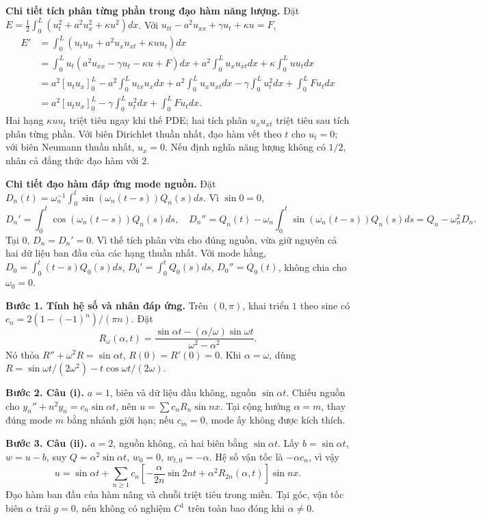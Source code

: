 \textbf{Chi tiết tích phân từng phần trong đạo hàm năng lượng.} Đặt $E=\frac12\int_0^L(u_t^2+a^2u_x^2+\kappa u^2)dx$. Với $u_{tt}-a^2u_{xx}+\gamma u_t+\kappa u=F$,
\[\begin{aligned}
E'&=\int_0^L(u_tu_{tt}+a^2u_xu_{xt}+\kappa uu_t)dx\\
&=\int_0^Lu_t(a^2u_{xx}-\gamma u_t-\kappa u+F)dx
+a^2\int_0^Lu_xu_{xt}dx+\kappa\int_0^Luu_tdx\\
&=a^2[u_tu_x]_0^L-a^2\int_0^Lu_{tx}u_xdx
+a^2\int_0^Lu_xu_{xt}dx-\gamma\int_0^Lu_t^2dx+\int_0^LFu_tdx\\
&=a^2[u_tu_x]_0^L-\gamma\int_0^Lu_t^2dx+\int_0^LFu_tdx.
\end{aligned}\]
Hai hạng $\kappa uu_t$ triệt tiêu ngay khi thế PDE; hai tích phân $u_xu_{xt}$ triệt tiêu sau tích phân từng phần. Với biên Dirichlet thuần nhất, đạo hàm vết theo $t$ cho $u_t=0$; với biên Neumann thuần nhất, $u_x=0$. Nếu định nghĩa năng lượng không có $1/2$, nhân cả đẳng thức đạo hàm với $2$.

\textbf{Chi tiết đạo hàm đáp ứng mode nguồn.} Đặt $D_n(t)=\omega_n^{-1}\int_0^t\sin(\omega_n(t-s))Q_n(s)ds$. Vì $\sin0=0$,
\[D_n'=\int_0^t\cos(\omega_n(t-s))Q_n(s)ds,\quad
D_n''=Q_n(t)-\omega_n\int_0^t\sin(\omega_n(t-s))Q_n(s)ds=Q_n-\omega_n^2D_n.\]
Tại $0$, $D_n=D_n'=0$. Vì thế tích phân vừa cho đúng nguồn, vừa giữ nguyên cả hai dữ liệu ban đầu của các hạng thuần nhất. Với mode hằng, $D_0=\int_0^t(t-s)Q_0(s)ds$, $D_0'=\int_0^tQ_0(s)ds$, $D_0''=Q_0(t)$, không chia cho $\omega_0=0$.

\textbf{Bước 1. Tính hệ số và nhân đáp ứng.} Trên $(0,\pi)$, khai triển $1$ theo sine có $c_n=2(1-(-1)^n)/(\pi n)$. Đặt
\[R_\omega(\alpha,t)=\frac{\sin\alpha t-(\alpha/\omega)\sin\omega t}{\omega^2-\alpha^2}.\]
Nó thỏa $R''+\omega^2R=\sin\alpha t$, $R(0)=R'(0)=0$. Khi $\alpha=\omega$, dùng $R=\sin\omega t/(2\omega^2)-t\cos\omega t/(2\omega)$.

\textbf{Bước 2. Câu (i).} $a=1$, biên và dữ liệu đầu không, nguồn $\sin\alpha t$. Chiếu nguồn cho $y_n''+n^2y_n=c_n\sin\alpha t$, nên $u=\sum c_nR_n\sin nx$. Tại cộng hưởng $\alpha=m$, thay đúng mode $m$ bằng nhánh giới hạn; nếu $c_m=0$, mode ấy không được kích thích.

\textbf{Bước 3. Câu (ii).} $a=2$, nguồn không, cả hai biên bằng $\sin\alpha t$. Lấy $b=\sin\alpha t$, $w=u-b$, suy $Q=\alpha^2\sin\alpha t$, $w_0=0$, $w_{t,0}=-\alpha$. Hệ số vận tốc là $-\alpha c_n$, vì vậy
\[u=\sin\alpha t+\sum_{n\ge1}c_n\left[-\frac\alpha{2n}\sin2nt+\alpha^2R_{2n}(\alpha,t)\right]\sin nx.\]
Đạo hàm ban đầu của hàm nâng và chuỗi triệt tiêu trong miền. Tại góc, vận tốc biên $\alpha$ trái $g=0$, nên không có nghiệm $C^1$ trên toàn bao đóng khi $\alpha\ne0$.

